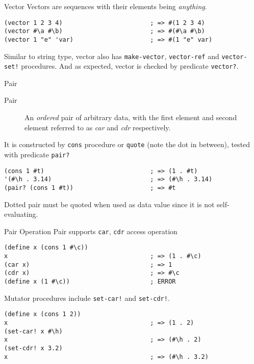 \documentclass[presentation]{beamer}
\begin{document}
\begin{frame}[fragile,label={sec:orgheadline30}]{Vector}
 Vectors are sequences with their elements being \emph{anything}.

\begin{verbatim}
(vector 1 2 3 4)                        ; => #(1 2 3 4)
(vector #\a #\b)                        ; => #(#\a #\b)
(vector 1 "e" 'var)                     ; => #(1 "e" var)
\end{verbatim}

Similar to string type, vector also has \texttt{make-vector}, \texttt{vector-ref}
and \texttt{vector-set!} procedures.  And as expected, vector is checked
by predicate \texttt{vector?}.
\end{frame}

\begin{frame}[fragile,label={sec:orgheadline31}]{Pair}
 \begin{description}
\item[{Pair}] An \emph{ordered} pair of arbitrary data, with the first
element and second element referred to as \emph{car} and \emph{cdr}
respectively.
\end{description}


It is constructed by \texttt{cons} procedure or \texttt{quote} (note the dot in
between), tested with predicate \texttt{pair?}

\begin{verbatim}
(cons 1 #t)                             ; => (1 . #t)
'(#\h . 3.14)                           ; => (#\h . 3.14)
(pair? (cons 1 #t))                     ; => #t
\end{verbatim}

Dotted pair must be quoted when used as data value since it is not
self-evaluating.
\end{frame}

\begin{frame}[fragile,label={sec:orgheadline32}]{Pair Operation}
 Pair supports \texttt{car}, \texttt{cdr} access operation

\begin{verbatim}
(define x (cons 1 #\c))
x                                       ; => (1 . #\c)
(car x)                                 ; => 1
(cdr x)                                 ; => #\c
(define x (1 #\c))                      ; ERROR
\end{verbatim}

Mutator procedures include \texttt{set-car!} and \texttt{set-cdr!}.

\begin{verbatim}
(define x (cons 1 2))
x                                       ; => (1 . 2)
(set-car! x #\h)
x                                       ; => (#\h . 2)
(set-cdr! x 3.2)
x                                       ; => (#\h . 3.2)
\end{verbatim}
\end{frame}
\end{document}

